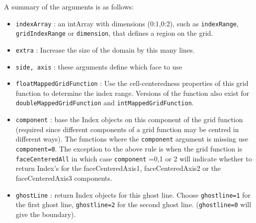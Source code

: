 \noindent A summary of the arguments is as follows:
\begin{itemize}
  \item {\tt indexArray} : an intArray with dimensions (0:1,0:2), such as
        {\tt indexRange}, {\tt gridIndexRange} or {\tt dimension}, that defines
        a region on the grid.
  \item {\tt extra} :  Increase the size of the domain by this many lines. 
  \item {\tt side, axis} : these arguments define which face to use
  \item {\tt floatMappedGridFunction} : Use the cell-centeredness properties of this grid function 
     to determine the index range. Versions of the function also exist for
    {\tt doubleMappedGridFunction} and {\tt intMappedGridFunction}. 
  \item {\tt component} : base the Index objects on this component of
    the grid function (required since different components of a grid function may be centred in
    different ways). The functions where the {\tt component} argument is missing use {\tt component=0}.
    The exception to the above rule is when the grid function 
    is {\tt faceCenteredAll} in which case {\tt component} =0,1 or 2 will indicate whether to return
   Index's for the faceCenteredAxis1, faceCenteredAxis2 or the faceCenteredAxis3 components.
  \item {\tt ghostLine} : return Index objects for this ghost line. Choose
    {\tt ghostline=1} for the first ghost line, {\tt ghostline=2} for the
    second ghost line. ({\tt ghostline=0} will give the boundary).
\end{itemize}




